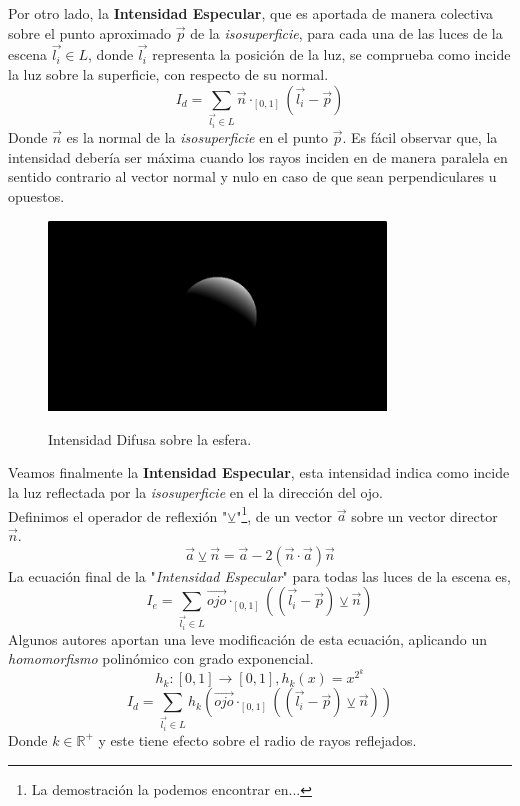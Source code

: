 Por otro lado, la \textbf{Intensidad Especular}, que es aportada de manera colectiva sobre el punto aproximado \(\Vec{p}\) de la \textit{isosuperficie}, para cada una de las luces de la escena \(\Vec{l_i}\in L\), donde \(\Vec{l_i}\) representa la posición de la luz, se comprueba como incide la luz sobre la superficie, con respecto de su normal. 
\[I_d = \sum_{\Vec{l_i}\in L} \Vec{n}\cdot_{[0, 1]}(\Vec{l_i}-\Vec{p})\]
Donde \(\Vec{n}\) es la normal de la \textit{isosuperficie} en el punto \(\Vec{p}\). Es fácil observar que, la intensidad debería ser máxima cuando los rayos inciden en de manera paralela en sentido contrario al vector normal y nulo en caso de que sean perpendiculares u opuestos.
\begin{figure}[H]
  \centering
  \captionsetup{justification=centering}%
  \includegraphics[width=0.8\textwidth]{secciones/imagenes/lightmodel/difusa.png}\label{fig:difusse}
  \caption{Intensidad Difusa sobre la esfera.}
\end{figure}
Veamos finalmente la \textbf{Intensidad Especular}, esta intensidad indica como incide la luz reflectada  por la \textit{isosuperficie} en el la dirección del ojo.\\
Definimos el operador de reflexión "\(\veebar\)"\footnote{La demostración la podemos encontrar en...}, de un vector \(\Vec{a}\) sobre un vector director \(\Vec{n}\).
\[\Vec{a}\veebar\Vec{n}=\Vec{a} - 2(\Vec{n} \cdot \Vec{a})\Vec{n}\]
La ecuación final de la "\textit{Intensidad Especular}" para todas las luces de la escena es,
\[I_e = \sum_{\Vec{l_i}\in L} \Vec{ojo}\cdot_{[0, 1]}\left(\left(\Vec{l_i}-\Vec{p}\right) \veebar \Vec{n}\right)\]
Algunos autores aportan una leve modificación de esta ecuación, aplicando un \textit{homomorfismo} polinómico con grado exponencial.
\[h_k:[0,1]\longrightarrow[0,1] , h_k(x)=x^{2^k}\]
\[I_d = \sum_{\Vec{l_i}\in L} h_k\left(\Vec{ojo}\cdot_{[0, 1]}\left(\left(\Vec{l_i}-\Vec{p}\right) \veebar \Vec{n}\right)\right)\]
Donde \(k\in\mathbb{R}^{+}\) y este tiene efecto sobre el radio de rayos reflejados.
